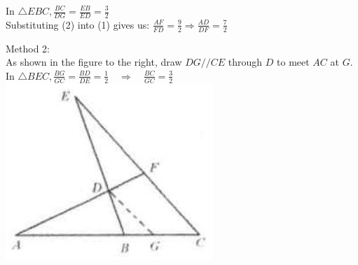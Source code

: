 \documentclass{article}
\begin{document}
In \(\triangle E B C, \frac{B C}{D G}=\frac{E B}{E D}=\frac{3}{2}\)\\
Substituting (2) into (1) gives us: \(\frac{A F}{F D}=\frac{9}{2} \Rightarrow \frac{A D}{D F}=\frac{7}{2}\)

Method 2:\\
As shown in the figure to the right, draw \(D G / / C E\) through \(D\) to meet \(A C\) at \(G\).\\
In \(\triangle B E C, \frac{B G}{G C}=\frac{B D}{D E}=\frac{1}{2} \quad \Rightarrow \quad \frac{B C}{G C}=\frac{3}{2}\)\\
\centering
\includegraphics[width=\textwidth]{images/111(1).jpg}
\end{document}

